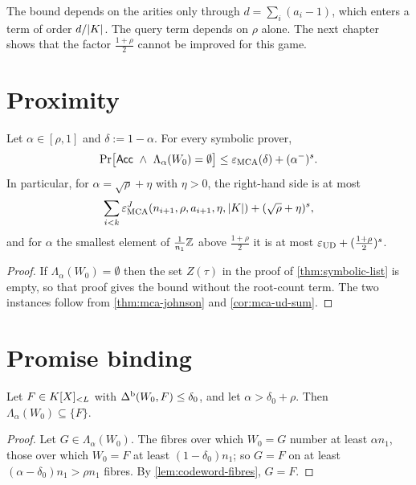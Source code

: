 \begin{remark}\label{rem:unique-binding-structure}
The bound depends on the arities only through $d=\sum_i(a_i-1)$, which enters a term of
order $d/|K|$. The query term depends on $\rho$ alone. The next chapter shows that
the factor $\frac{1+\rho}2$ cannot be improved for this game.
\end{remark}

\section{Proximity}

\begin{theorem}[Proximity]\label{thm:proximity}
Let $\alpha\in[\rho,1]$ and $\delta:=1-\alpha$. For every symbolic prover,
\[
\Pr\bigl[\Acc\ \wedge\ \Lambda_\alpha(W_0)=\emptyset\bigr]\le\eps_{\MCA}(\delta)+(\alpha^-)^s .
\]
In particular, for $\alpha=\sqrt\rho+\eta$ with $\eta>0$, the right-hand side is at most
\[
\sum_{i<k}\varepsilon^J_{\mathrm{MCA}}(n_{i+1},\rho,a_{i+1},\eta,|K|)+(\sqrt\rho+\eta)^s,
\]
and for
$\alpha$ the smallest element of $\frac1{n_1}\mathbb{Z}$ above $\frac{1+\rho}2$ it is at most
$\varepsilon_{\mathrm{UD}}+(\frac{1+\rho}2)^s$.
\end{theorem}

\begin{proof}
If $\Lambda_\alpha(W_0)=\emptyset$ then the set $Z(\tau)$ in the proof of
\cref{thm:symbolic-list} is empty, so that proof gives the bound without the root-count
term. The two instances follow from \cref{thm:mca-johnson} and \cref{cor:mca-ud-sum}.
\end{proof}

\section{Promise binding}

\begin{lemma}\label{lem:promise-list}
Let $F\in K[X]_{<L}$ with $\Delta^{\mathrm{b}}(W_0,F)\le\delta_0$, and let $\alpha>\delta_0+\rho$. Then
$\Lambda_\alpha(W_0)\subseteq\{F\}$.
\end{lemma}

\begin{proof}
Let $G\in\Lambda_\alpha(W_0)$. The fibres over which $W_0=G$ number at least $\alpha n_1$,
those over which $W_0=F$ at least $(1-\delta_0)n_1$; so $G=F$ on at least
$(\alpha-\delta_0)n_1>\rho n_1$ fibres. By \cref{lem:codeword-fibres}, $G=F$.
\end{proof}

